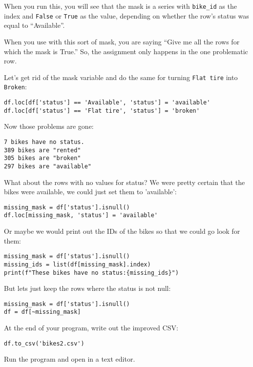 When you run this, you will see that the mask is a series with
\texttt{bike\_id} as the index and \texttt{False} or \texttt{True} as the value,
depending on whether the row's status was equal to ``Available''.

When you use  with this sort of mask, you are saying
``Give me all the rows for which the mask is True.''  So, the
assignment only happens in the one problematic row.

Let's get rid of the mask variable and do the same for turning \texttt{Flat tire} into \texttt{Broken}:

\begin{Verbatim}
df.loc[df['status'] == 'Available', 'status'] = 'available'
df.loc[df['status'] == 'Flat tire', 'status'] = 'broken'
\end{Verbatim}

Now those problems are gone:
\begin{Verbatim}
7 bikes have no status.
389 bikes are "rented"
305 bikes are "broken"
297 bikes are "available"
\end{Verbatim}

What about the rows with no values for status? We were pretty certain
that the bikes were available, we could just set them to 'available':

\begin{Verbatim}
missing_mask = df['status'].isnull()
df.loc[missing_mask, 'status'] = 'available'
\end{Verbatim}

Or maybe we would print out the IDs of the bikes so that we could go look for them:

\begin{Verbatim}
missing_mask = df['status'].isnull()
missing_ids = list(df[missing_mask].index)
print(f"These bikes have no status:{missing_ids}")
\end{Verbatim}

But lets just keep the rows where the status is not null:
\begin{Verbatim}
missing_mask = df['status'].isnull()
df = df[~missing_mask]
\end{Verbatim}

At the end of your program, write out the improved CSV:

\begin{Verbatim}
df.to_csv('bikes2.csv')
\end{Verbatim}

Run the program and open  in a text editor.

